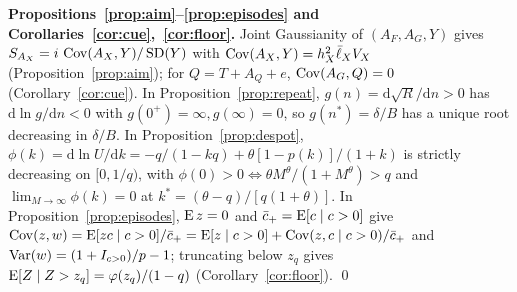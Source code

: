 \noindent\textbf{Propositions~\ref{prop:aim}--\ref{prop:episodes} and Corollaries~\ref{cor:cue},~\ref{cor:floor}.} Joint Gaussianity of $(A_F,A_G,Y)$ gives $S_{A_X}=i\,\operatorname{Cov}(A_X,Y)/\operatorname{SD}(Y)$ with $\operatorname{Cov}(A_X,Y)=h_X^2\bar\ell_XV_X$ (Proposition~\ref{prop:aim}); for $Q=T+A_Q+e$, $\operatorname{Cov}(A_G,Q)=0$ (Corollary~\ref{cor:cue}). In Proposition~\ref{prop:repeat}, $g(n)=\mathrm d\sqrt{R}/\mathrm dn>0$ has $\mathrm d\ln g/\mathrm dn<0$ with $g(0^+)=\infty,g(\infty)=0$, so $g(n^*)=\delta/B$ has a unique root decreasing in $\delta/B$. In Proposition~\ref{prop:despot}, $\phi(k)=\mathrm d\ln U/\mathrm dk=-q/(1-kq)+\theta[1-p(k)]/(1+k)$ is strictly decreasing on $[0,1/q)$, with $\phi(0)>0\iff\theta M^\theta/(1+M^\theta)>q$ and $\lim_{M\to\infty}\phi(k)=0$ at $k^*=(\theta-q)/[q(1+\theta)]$. In Proposition~\ref{prop:episodes}, $\operatorname{E} z=0$ and $\bar c_+=\operatorname{E}[c\mid c>0]$ give $\operatorname{Cov}(z,w)=\operatorname{E}[zc\mid c>0]/\bar c_+=\operatorname{E}[z\mid c>0]+\operatorname{Cov}(z,c\mid c>0)/\bar c_+$ and $\operatorname{Var}(w)=(1+I_{c>0})/p-1$; truncating below $z_q$ gives $\operatorname{E}[Z\mid Z>z_q]=\varphi(z_q)/(1-q)$ (Corollary~\ref{cor:floor}). \qed

